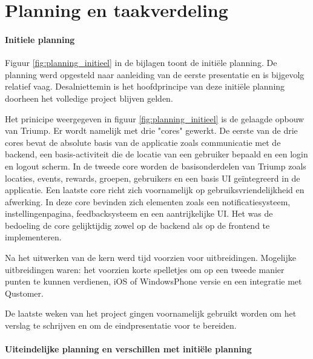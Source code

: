 
\chapter{Planning en taakverdeling}


\subsubsection{Initiele planning}

Figuur \ref{fig:planning_initieel} in de bijlagen toont de initiële planning. De planning werd opgesteld naar aanleiding van de eerste presentatie en is bijgevolg relatief vaag. Desalniettemin is het hoofdprincipe van deze initiële planning doorheen het volledige project blijven gelden. 

Het prinicipe weergegeven in figuur \ref{fig:planning_initieel} is de gelaagde opbouw van Triump. Er wordt namelijk met drie "cores" gewerkt. De eerste van de drie cores bevat de absolute basis van de applicatie zoals communicatie met de backend, een basis-activiteit die de locatie van een gebruiker bepaald en een login en logout scherm. In de tweede core worden de basisonderdelen van Triump zoals locaties, events, rewards, groepen, gebruikers en een basis UI geïntegreerd in de applicatie. Een laatste core richt zich voornamelijk op gebruiksvriendelijkheid en afwerking. In deze core bevinden zich elementen zoals een notificatiesysteem, instellingenpagina, feedbacksysteem en een aantrijkelijke UI. Het was de bedoeling de core gelijktijdig zowel op de backend als op de frontend te implementeren.

Na het uitwerken van de kern werd tijd voorzien voor uitbreidingen. Mogelijke uitbreidingen waren: het voorzien korte spelletjes om op een tweede manier punten te kunnen verdienen, iOS of WindowsPhone versie en een integratie met Qustomer. 

De laatste weken van het project gingen voornamelijk gebruikt worden om het verslag te schrijven en om de eindpresentatie voor te bereiden.

\subsubsection{Uiteindelijke planning en verschillen met initiële planning}

